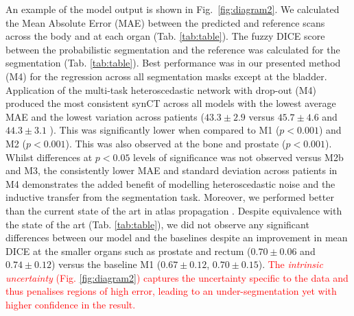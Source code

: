 An example of the model output is shown in Fig.~\ref{fig:diagram2}. We calculated the Mean Absolute Error (MAE) between the predicted and reference scans across the body and at each organ (Tab. \ref{tab:table}). The fuzzy DICE score between the probabilistic segmentation and the reference was calculated for the segmentation (Tab. \ref{tab:table}). Best performance was in our presented method (M4) for the regression across all segmentation masks except at the bladder. Application of the multi-task heteroscedastic network with drop-out (M4) produced the most consistent synCT across all models with the lowest average MAE and the lowest variation across patients ($43.3\pm2.9$ versus $45.7\pm4.6$ \cite{ninon2017} and $44.3\pm3.1$ \cite{kendall2017multi}). This was significantly lower when compared to M1 ($p<0.001$) and M2 ($p<0.001$). This was also observed at the bone and prostate ($p<0.001$). Whilst differences at $p<0.05$ levels of significance was not observed versus M2b and M3, the consistently lower MAE and standard deviation across patients in M4 demonstrates the added benefit of modelling heteroscedastic noise and the inductive transfer from the segmentation task. Moreover, we performed better than the current state of the art in atlas propagation \cite{ninon2017}. Despite equivalence with the state of the art (Tab. \ref{tab:table}), we did not observe any significant differences between our model and the baselines despite an improvement in mean DICE at the smaller organs such as prostate and rectum ($0.70\pm0.06$ and $0.74\pm0.12$) versus the baseline M1 ($0.67\pm0.12$, $0.70\pm0.15$). \textcolor{red}{The \emph{intrinsic uncertainty} (Fig. \ref{fig:diagram2}) captures the uncertainty specific to the data and thus penalises regions of high error, leading to an under-segmentation yet with higher confidence in the result.}

%
%


